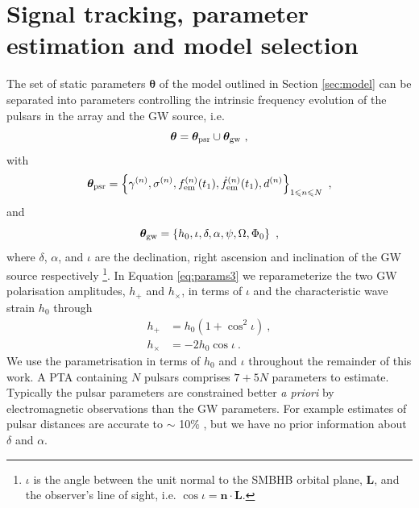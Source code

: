 \documentclass[fleqn,usenatbib,useAMS]{mnras}
\begin{document}
\section{Signal tracking, parameter estimation and model selection} \label{sec:detect}
The set of static parameters $\boldsymbol{\theta}$ of the model outlined in Section \ref{sec:model} can be separated into parameters controlling the intrinsic frequency evolution of the pulsars in the array and the GW source, i.e. 
\begin{equation}
	\boldsymbol{\theta} =  \boldsymbol{\theta}_{\rm psr} \cup \boldsymbol{\theta}_{\rm gw} \ , \label{eq:params1}
\end{equation}
with
\begin{equation}
	\boldsymbol{\theta}_{\rm psr} = \left \{ \gamma^{(n)},\sigma^{(n)}, f_{\rm em}^{(n)}(t_1),\dot{f}_{\rm em}^{(n)}(t_1),d^{(n)}\right\}_{1\leq n \leq N} \ , \label{eq:psrparams}
\end{equation}
and
\begin{equation}
	\boldsymbol{\theta}_{\rm gw} = \left \{h_0, \iota, \delta, \alpha, \psi, \Omega, \Phi_0 \right \} \ ,  \label{eq:params3}
\end{equation}
where $\delta$, $\alpha$, and $\iota$ are the declination, right ascension and inclination of the GW source respectively \footnote{$\iota$ is the angle between the unit normal to the SMBHB orbital plane, $\boldsymbol{L}$, and the observer's line of sight, i.e. $\cos \iota = \boldsymbol{n} \cdot \boldsymbol{L}$.}. In Equation \eqref{eq:params3} we reparameterize the two GW polarisation amplitudes, $h_{+}$ and $h_{\times}$, in terms of $\iota$ and the characteristic wave strain $h_0$ through 
\begin{align}
	h_+ &= h_0(1 + \cos^2 \iota) 	\label{eq:hphx} \ ,\\
	h_{\times} &= -2h_0\cos \iota 	\label{eq:hphx2} \ .
\end{align}
We use the parametrisation in terms of $h_0$ and $\iota$ throughout the remainder of this work. A PTA containing $N$ pulsars comprises $7 + 5N$ parameters to estimate. Typically the pulsar parameters are constrained better \textit{a priori} by electromagnetic observations than the GW parameters. For example estimates of pulsar distances are accurate to $\sim$ 10$\%$ \citep{Cordes2002astro.ph..7156C, Verbiest2012ApJ...755...39V, Desvignes2016,Yao2017}, but we have no prior information about $\delta$ and $\alpha$. \newline 
\end{document}
